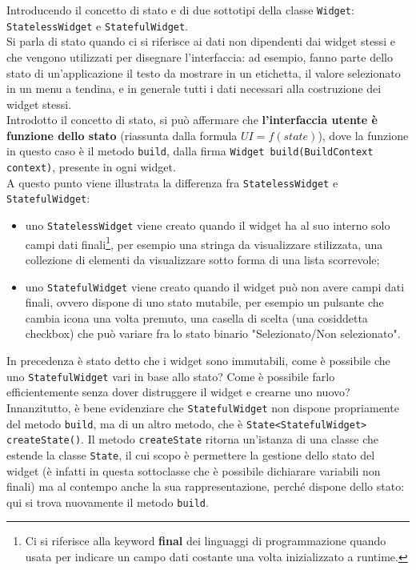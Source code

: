 Introducendo il concetto di stato e di due sottotipi della classe \texttt{Widget}: \texttt{StatelessWidget} e \texttt{StatefulWidget}.\\
Si parla di stato quando ci si riferisce ai dati non dipendenti dai widget stessi e che vengono utilizzati per disegnare l'interfaccia: ad esempio, fanno parte dello stato di un'applicazione il testo da mostrare in un etichetta, il valore selezionato in un menu a tendina, e in generale tutti i dati necessari alla costruzione dei widget stessi.\\
Introdotto il concetto di stato, si può affermare che \textbf{l'interfaccia utente è funzione dello stato} (riassunta dalla formula $UI = f(state)$), dove la funzione in questo caso è il metodo \texttt{build}, dalla firma \texttt{Widget build(BuildContext context)}, presente in ogni widget.\\
A questo punto viene illustrata la differenza fra \texttt{StatelessWidget} e \texttt{StatefulWidget}:
\begin{itemize}
    \item uno \texttt{StatelessWidget} viene creato quando il widget ha al suo interno solo campi dati finali\footnote{Ci si riferisce alla keyword \textbf{final} dei linguaggi di programmazione quando usata per indicare un campo dati costante una volta inizializzato a runtime.}, per esempio una stringa da visualizzare stilizzata, una collezione di elementi da visualizzare sotto forma di una lista scorrevole;
    \item uno \texttt{StatefulWidget} viene creato quando il widget può non avere campi dati finali, ovvero dispone di uno stato mutabile, per esempio un pulsante che cambia icona una volta premuto, una casella di scelta (una cosiddetta checkbox) che può variare fra lo stato binario "Selezionato/Non selezionato".
\end{itemize}
In precedenza è stato detto che i widget sono immutabili, come è possibile che uno \texttt{StatefulWidget} vari in base allo stato? Come è possibile farlo efficientemente senza dover distruggere il widget e crearne uno nuovo?\\
Innanzitutto, è bene evidenziare che \texttt{StatefulWidget} non dispone propriamente del metodo \texttt{build}, ma di un altro metodo, che è \texttt{State<StatefulWidget> createState()}.
Il metodo \texttt{createState} ritorna un'istanza di una classe che estende la classe \texttt{State}, il cui scopo è permettere la gestione dello stato del widget (è infatti in questa sottoclasse che è possibile dichiarare variabili non finali) ma al contempo anche la sua rappresentazione, perché dispone dello stato: qui si trova nuovamente il metodo \texttt{build}.\\
